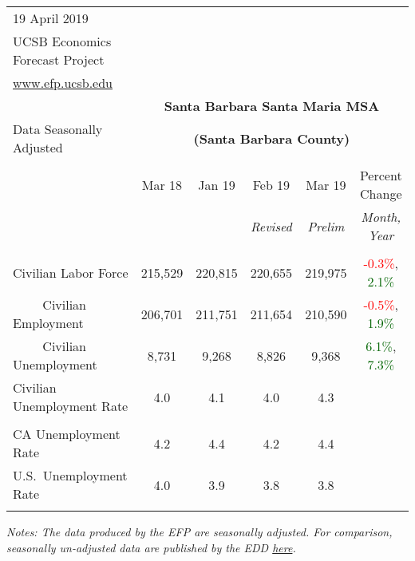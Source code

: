 \documentclass[12pt]{article}
\begin{document}
\begin{table}
\begin{tabular}{|l|c|c|c|c|c|}
\multicolumn{1}{l}{\small 19 April 2019} & \multicolumn{5}{c}{} \\
\multicolumn{1}{l}{\small UCSB Economics Forecast Project} & \multicolumn{5}{c}{} \\
\multicolumn{1}{l}{\small \href{http://www.efp.ucsb.edu/}{www.efp.ucsb.edu}} & \multicolumn{5}{c}{} \\
\multicolumn{1}{c}{} & \multicolumn{5}{c}{\large \textbf{Santa Barbara Santa Maria MSA}} \\
\multicolumn{1}{l}{\small Data Seasonally Adjusted} & \multicolumn{5}{c}{\small \textbf{(Santa Barbara County)}} \\ \hline \hline
& & & & & \\
 & Mar 18 & Jan 19 & Feb 19 & Mar 19 & Percent Change \\
 & & & \small \textit{Revised} & \small \textit{Prelim} & \small \textit{Month, Year} \\ \hline
& & & & & \\
Civilian Labor Force & 215,529 & 220,815 & 220,655 & 219,975 & \textcolor{red}{-0.3\%}, \textcolor{darkgreen}{2.1\%} \\
$\qquad$ \small Civilian Employment & 206,701 & 211,751 & 211,654 & 210,590 & \textcolor{red}{-0.5\%}, \textcolor{darkgreen}{1.9\%} \\
$\qquad$ \small Civilian Unemployment & 8,731 & 9,268 & 8,826 & 9,368 & \textcolor{darkgreen}{6.1\%}, \textcolor{darkgreen}{7.3\%} \\
Civilian Unemployment Rate & 4.0 & 4.1 & 4.0 & 4.3 & \\
& & & & & \\
CA Unemployment Rate & 4.2 & 4.4 & 4.2 & 4.4 & \\
U.S.\ Unemployment Rate & 4.0 & 3.9 & 3.8 & 3.8 & \\
& & & & & \\ \hline \hline
\end{tabular}
\par
\vspace{.5em}
\footnotesize
\textit{Notes: The data produced by the EFP are seasonally adjusted. For comparison, seasonally un-adjusted data are published by the EDD \href{http://www.labormarketinfo.ca.gov/file/lfmonth/satb$pds.pdf}{here}.}
\end{table}
\end{document}
